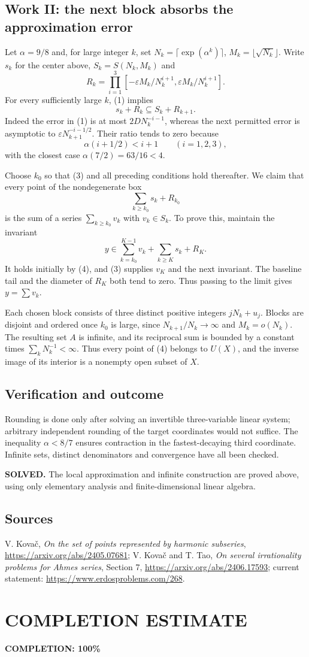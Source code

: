 \subsection{Work II: the next block absorbs the approximation error}
Let $\alpha=9/8$ and, for large integer $k$, set
$N_k=\lceil\exp(\alpha^k)\rceil$, $M_k=\lfloor\sqrt{N_k}\rfloor$. Write $s_k$ for the center above, $S_k=S(N_k,M_k)$ and
\[
 R_k=\prod_{i=1}^3[-\varepsilon M_k/N_k^{i+1},
                         \varepsilon M_k/N_k^{i+1}].
\]
For every sufficiently large $k$, (1) implies
\[
 s_k+R_k\subseteq S_k+R_{k+1}.
 \tag{3}
\]
Indeed the error in (1) is at most $2DN_k^{-i-1}$, whereas the next permitted error is asymptotic to $\varepsilon N_{k+1}^{-i-1/2}$. Their ratio tends to zero because
\[
 \alpha(i+1/2)<i+1\qquad(i=1,2,3),
\]
with the closest case $\alpha(7/2)=63/16<4$.

Choose $k_0$ so that (3) and all preceding conditions hold thereafter. We claim that every point of the nondegenerate box
\[
 \sum_{k\ge k_0}s_k+R_{k_0}
 \tag{4}
\]
is the sum of a series $\sum_{k\ge k_0}v_k$ with $v_k\in S_k$. To prove this, maintain the invariant
\[
 y\in\sum_{k=k_0}^{K-1}v_k+\sum_{k\ge K}s_k+R_K.
\]
It holds initially by (4), and (3) supplies $v_K$ and the next invariant. The baseline tail and the diameter of $R_K$ both tend to zero. Thus passing to the limit gives $y=\sum v_k$.

Each chosen block consists of three distinct positive integers $jN_k+u_j$. Blocks are disjoint and ordered once $k_0$ is large, since $N_{k+1}/N_k\to\infty$ and $M_k=o(N_k)$. The resulting set $A$ is infinite, and its reciprocal sum is bounded by a constant times $\sum_kN_k^{-1}<\infty$. Thus every point of (4) belongs to $U(X)$, and the inverse image of its interior is a nonempty open subset of $X$.

\subsection{Verification and outcome}
Rounding is done only after solving an invertible three-variable linear system; arbitrary independent rounding of the target coordinates would not suffice. The inequality $\alpha<8/7$ ensures contraction in the fastest-decaying third coordinate. Infinite sets, distinct denominators and convergence have all been checked.

\textbf{SOLVED.} The local approximation and infinite construction are proved above, using only elementary analysis and finite-dimensional linear algebra.

\subsection{Sources}
V. Kova\v c, \emph{On the set of points represented by harmonic subseries}, \url{https://arxiv.org/abs/2405.07681}; V. Kova\v c and T. Tao, \emph{On several irrationality problems for Ahmes series}, Section 7, \url{https://arxiv.org/abs/2406.17593}; current statement: \url{https://www.erdosproblems.com/268}.
\section{COMPLETION ESTIMATE}
\textbf{COMPLETION: 100\%}
